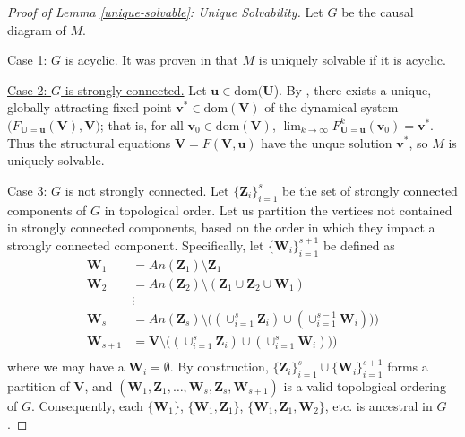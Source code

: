 \documentclass[12pt]{article}
\begin{document}

\begin{proof}[Proof of Lemma \ref{unique-solvable}: Unique Solvability]
Let $G$ be the causal diagram of $M$. 

\underline{Case 1: $G$ is acyclic.}
It was proven in \cite{Foundations} that $M$ is uniquely solvable if it is acyclic.

\underline{Case 2: $G$ is strongly connected.}
Let $\mathbf{u}\in\text{dom}(\mathbf{U}$).
By \cite{ReberIntrinsic}, there exists a unique, globally attracting fixed point $\mathbf{v}^*\in\text{dom}(\mathbf{V})$ of the dynamical system $\big(F_{\mathbf{U}=\mathbf{u}}(\mathbf{V}),\mathbf{V}\big)$; that is, for all $\mathbf{v}_0\in\text{dom}(\mathbf{V})$, $\lim_{k\to\infty}F^{k}_{\mathbf{U}=\mathbf{u}}(\mathbf{v}_0)=\mathbf{v}^*$.
Thus the structural equations $\mathbf{V}=F(\mathbf{V},\mathbf{u})$ have the unque solution $\mathbf{v}^*$, so $M$ is uniquely solvable.

\underline{Case 3: $G$ is not strongly connected.}
Let $\{\mathbf{Z}_i\}_{i=1}^s$ be the set of strongly connected components of $G$ in topological order.
Let us partition the vertices not contained in strongly connected components, based on the order in which they impact a strongly connected component. Specifically, let $\{\mathbf{W}_i\}_{i=1}^{s+1}$ be defined as 
\begin{align*}
\mathbf{W}_1 &= An(\mathbf{Z}_1)\setminus \mathbf{Z}_1 \\
\mathbf{W}_2 &= An(\mathbf{Z}_2)\setminus (\mathbf{Z}_1\cup\mathbf{Z}_2\cup\mathbf{W}_1) \\
&\vdots \\
\mathbf{W}_s &= An(\mathbf{Z}_s)\setminus \big((\cup_{i=1}^s\mathbf{Z}_i)\cup(\cup_{i=1}^{s-1}\mathbf{W}_i))\big) \\
\mathbf{W}_{s+1} &= \mathbf{V}\setminus \big((\cup_{i=1}^s\mathbf{Z}_i)\cup(\cup_{i=1}^{s}\mathbf{W}_i))\big) \\
\end{align*}
where we may have a $\mathbf{W}_i=\emptyset$.
By construction, $\{\mathbf{Z}_i\}_{i=1}^s \cup \{\mathbf{W}_i\}_{i=1}^{s+1}$ forms a partition of $\mathbf{V}$, and $(\mathbf{W}_1,\mathbf{Z}_1,\hdots,\mathbf{W}_s,\mathbf{Z}_s,\mathbf{W}_{s+1})$ is a valid topological ordering of $G$.
Consequently, each $\{\mathbf{W}_1\}$, $\{\mathbf{W}_1,\mathbf{Z}_1\}$, $\{\mathbf{W}_1,\mathbf{Z}_1,\mathbf{W}_2\}$, etc. is ancestral in $G$.


\end{proof}
\end{document}
